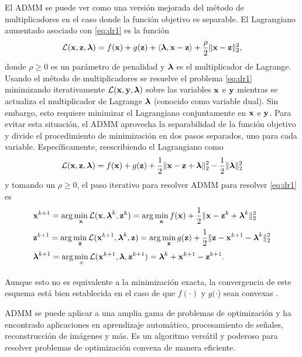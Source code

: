 	El ADMM se puede ver como una versión mejorada del método de multiplicadores en el caso donde la función objetivo es separable. El Lagrangiano aumentado asociado con \eqref{eq:dr1} es la función 
	\begin{equation}
		\mathcal{L}(\mathbf{x},\mathbf{z},\boldsymbol{\lambda}) = f(\mathbf{x}) + g(\mathbf{z}) +\langle\boldsymbol{\lambda},\mathbf{x}-\mathbf{z}\rangle + \frac{\rho}{2}\|\mathbf{x}-\mathbf{z}\|^2_2,
		\label{eq:dr2}
	\end{equation}
	donde $\rho\ge 0$ es un parámetro de penalidad y $\boldsymbol{\lambda}$ es el multiplicador de Lagrange. Usando el método de multiplicadores se resuelve el problema \eqref{eq:dr1} minimizando iterativamente $\mathcal{L}(\mathbf{x},\mathbf{y},\boldsymbol{\lambda})$ sobre las variables $\mathbf{x}$ e $\mathbf{y}$ mientras se actualiza el multiplicador de Lagrange $\boldsymbol{\lambda}$ (conocido como variable dual). Sin embargo, esto requiere minimizar el Lagrangiano conjuntamente en $\mathbf{x}$ e $\mathbf{y}$. Para evitar esta situación, el ADMM aprovecha la separabilidad de la función objetivo y divide el procedimiento de minimización en dos pasos separados, uno para cada variable.  Específicamente, reescribiendo el Lagrangiano como
	\begin{equation}
		\mathcal{L}(\mathbf{x},\mathbf{z},\boldsymbol{\lambda}) = f(\mathbf{x}) + g(\mathbf{z}) +\frac{1}{2}\|\mathbf{x}-\mathbf{z}+\boldsymbol{\lambda}\|_2^2 - \frac{1}{2}\|\boldsymbol{\lambda}\|_2^2
		\label{eq:dr4}
	\end{equation}
	y tomando un $\rho \ge 0$, el paso iterativo para resolver ADMM para resolver \eqref{eq:dr1} es
	\begin{equation}
		\begin{aligned}
			& \mathbf{x}^{k+1} = \arg\min_{\mathbf{x}}\mathcal{L}(\mathbf{x},\boldsymbol{\lambda}^k,\mathbf{z}^k) = \arg\min_{\mathbf{x}} f(\mathbf{x}) + \frac{1}{2}\|\mathbf{x} - \mathbf{z}^k + \boldsymbol{\lambda}^k\|_2^2 \\[0.3em]
			& \mathbf{z}^{k+1} = \arg\min_{\mathbf{z}}\mathcal{L}(\mathbf{x}^{k+1},\boldsymbol{\lambda}^k,\mathbf{z}) = \arg\min_{\mathbf{z}} g(\mathbf{z}) + \frac{1}{2}\|\mathbf{z} - \mathbf{x}^{k+1}-\boldsymbol{\lambda}^k\|_2^2 \\[0.3em]
			& \boldsymbol{\lambda}^{k+1} = \arg\min_{x}\mathcal{L}(\mathbf{x}^{k+1},\boldsymbol{\lambda},\mathbf{z}^{k+1}) = \boldsymbol{\lambda}^k + \mathbf{x}^{k+1}-\mathbf{z}^{k+1}. \\[0.3em]
		\end{aligned}
		\label{eq:dr5}
	\end{equation}
	
	Aunque esto no es equivalente a la minimización exacta, la convergencia de este esquema está bien establecida en el caso de que $f(\cdot)$ y $g(\cdot$) sean convexas \cite{Parikh2014}.

    ADMM se puede aplicar a una amplia gama de problemas de optimización y ha encontrado aplicaciones en aprendizaje automático, procesamiento de señales, reconstrucción de imágenes y más. Es un algoritmo versátil y poderoso para resolver problemas de optimización convexa de manera eficiente.
	
	
	
